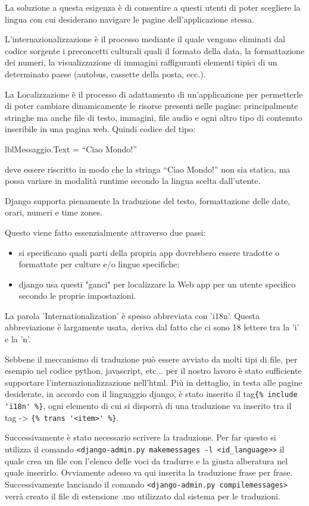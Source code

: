 La soluzione a questa esigenza è di consentire a questi utenti di poter scegliere la lingua con cui desiderano navigare le pagine dell’applicazione stessa.

L'internazionalizzazione è il processo mediante il quale vengono eliminati dal codice sorgente i preconcetti culturali quali il formato della data, la formattazione dei numeri, la visualizzazione di immagini raffiguranti elementi tipici di un determinato paese (autobus, cassette della posta, ecc.). 

La Localizzazione è il processo di adattamento di un’applicazione per permetterle di poter cambiare dinamicamente le risorse presenti nelle pagine: principalmente stringhe ma anche file di testo, immagini, file audio e ogni altro tipo di contenuto inseribile in una pagina web.
Quindi codice del tipo:

lblMessaggio.Text = “Ciao Mondo!”

deve essere riscritto in modo che la stringa “Ciao Mondo!” non sia statica, ma possa variare in modalità runtime secondo la lingua scelta dall’utente.

Django supporta pienamente la traduzione del testo, formattazione delle date, orari, numeri e  time zones.

Questo viene fatto essenzialmente attraverso due passi:
\begin{itemize}
	\item si specificano quali parti della propria app dovrebbero essere tradotte o formattate per culture e/o lingue specifiche;
	\item django usa questi "ganci" per localizzare la Web app per un utente specifico secondo le proprie impostazioni.
\end{itemize}

La parola 'Internationalization' è spesso abbreviata con 'i18n'. Questa abbreviazione è largamente usata, deriva dal fatto che ci sono 18 lettere tra la 'i' e la 'n'.

Sebbene il meccanismo di traduzione può essere avviato da molti tipi di file, per esempio nel codice python, javascript, etc... per il nostro lavoro è stato sufficiente supportare l'internazionalizzazione nell'html. Più in dettaglio, in testa alle pagine desiderate, in accordo con il linguaggio django, è stato inserito  il tag\lstinline${% include 'i18n' %}$, ogni elemento di cui si disporrà di una traduzione va inserito tra il tag -> \lstinline${% trans '<item>' %}$.

Successivamente è stato necessario scrivere la traduzione. Per far questo si utilizza il comando
\lstinline$<django-admin.py makemessages -l <id_language>>$
il quale crea un file con l'elenco delle voci da tradurre e la giusta alberatura  nel quale inserirlo. Ovviamente adesso va qui inserita la traduzione frase per frase. Successivamente lanciando il comando 
\lstinline$<django-admin.py compilemessages>$
verrà creato il file di estensione .mo utilizzato dal sistema per le traduzioni.

\endinput
